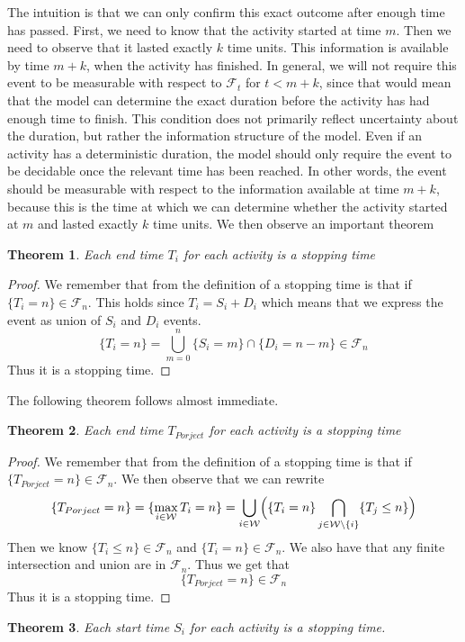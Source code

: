 \documentclass[11pt,a4paper]{article}
\newcommand{\cF}{\mathcal{F}}
\newcommand{\1}{\mathbf{1}}
\theoremstyle{definition}
\theoremstyle{plain}
\newtheorem{theorem}{Theorem}[section]
\theoremstyle{remark}
\numberwithin{equation}{section}
\begin{document}
The intuition is that we can only confirm this exact outcome after enough time has passed. First, we need to know that the activity started at time $m$. Then we need to observe that it lasted exactly $k$ time units. This information is available by time $m+k$, when the activity has finished. In general, we will not require this event to be measurable with respect to $\cF_t$ for $t<m+k$, since that would mean that the model can determine the exact duration before the activity has had enough time to finish. This condition does not primarily reflect uncertainty about the duration, but rather the information structure of the model. Even if an activity has a deterministic duration, the model should only require the event to be decidable once the relevant time has been reached. In other words, the event should be measurable with respect to the information available at time $m+k$, because this is the time at which we can determine whether the activity started at $m$ and lasted exactly $k$ time units. We then  observe an important theorem 
\begin{theorem}
    Each end time $T_i$ for each activity is a stopping time
\end{theorem}
\begin{proof}
    We remember that from the definition of a stopping time is that if $\{T_i=n\} \in \cF_{n}$. This holds since $T_i=S_i+D_i$ which means that we express the event as union of $S_i$ and $D_i$ events.
    \[
\{T_i=n\} = \bigcup_{m=0}^{n} \{S_i=m\}\cap \{D_i = n-m\} \in \cF_{n}
\]
Thus it is a stopping time.
\end{proof}
    The following theorem follows almost immediate.
    \begin{theorem}
    Each end time $T_{Porject}$ for each activity is a stopping time
\end{theorem}
\begin{proof}
    We remember that from the definition of a stopping time is that if $\{T_{Porject}=n\} \in \cF_{n}$. We then observe that we can rewrite
    \[
    \{T_{Porject}=n\} = \{\max_{i\in\mathcal{W}}T_i = n\}=\bigcup_{i\in\mathcal{W}}\Bigl( \{T_i = n\} \bigcap_{j\in\mathcal{W}\setminus \{i\}} \{T_j \leq  n\} \Bigr )
    \]
    Then we know $\{T_i \leq  n\} \in \cF_n$ and $\{T_i =  n\} \in \cF_n$. We also have that any finite intersection and union are in $\cF_n$. Thus we get that
    \[
    \{T_{Porject}=n\} \in \cF_n
    \]
    Thus it is a stopping time.
\end{proof}
   \begin{theorem}
    Each start time $S_i$ for each activity is a stopping time.
\end{theorem} 
\end{document}
